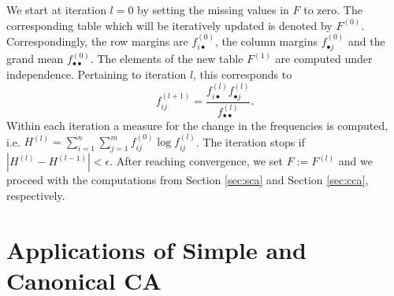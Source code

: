 \documentclass[article]{Z}
\begin{document}
We start at iteration $l=0$ by setting the missing values in $F$ to zero. The corresponding table which will be iteratively updated is denoted by $F^{(0)}$. Correspondingly, the row margins are $f_{i\bullet}^{(0)}$, the column margins $f_{\bullet j}^{(0)}$ and the grand mean $f_{\bullet \bullet}^{(0)}$. The elements of the new table $F^{(1)}$ are computed under independence. Pertaining to iteration $l$, this corresponds to
\begin{equation}
f_{ij}^{(l+1)}=\frac{f_{i\bullet}^{(l)}f_{\bullet j}^{(l)}}{f_{\bullet \bullet}^{(l)}}.
\end{equation}
Within each iteration a measure for the change in the frequencies is computed, i.e. $H^{(l)}=\sum_{i=1}^n \sum_{j=1}^m f_{ij}^{(0)}\log{f_{ij}^{(l)}}$. The iteration stops if $|H^{(l)}-H^{(l-1)}| < \epsilon$. After reaching convergence, we set $F:=F^{(l)}$ and we proceed with the computations from Section \ref{sec:sca} and Section \ref{sec:cca}, respectively.

\section{Applications of Simple and Canonical CA}
\label{sec:app}
\end{document}
